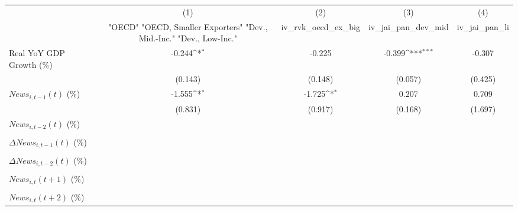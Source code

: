 {
\def\sym#1{\ifmmode^{#1}\else\(^{#1}\)\fi}
\begin{tabular}{l*{4}{c}}
\toprule
                    &\multicolumn{1}{c}{(1)}&\multicolumn{1}{c}{(2)}&\multicolumn{1}{c}{(3)}&\multicolumn{1}{c}{(4)}\\
                    &\multicolumn{1}{c}{ "OECD" "OECD, Smaller Exporters" "Dev., Mid.-Inc." "Dev., Low-Inc."}&\multicolumn{1}{c}{iv_rvk_oecd_ex_big}&\multicolumn{1}{c}{iv_jai_pan_dev_mid}&\multicolumn{1}{c}{iv_jai_pan_li}\\
\midrule
Real YoY GDP Growth (\%)&      -0.244\sym{*}  &      -0.225         &      -0.399\sym{***}&      -0.307         \\
                    &     (0.143)         &     (0.148)         &     (0.057)         &     (0.425)         \\
\addlinespace
$ News_{i,t-1}(t)$ (\%)&      -1.555\sym{*}  &      -1.725\sym{*}  &       0.207         &       0.709         \\
                    &     (0.831)         &     (0.917)         &     (0.168)         &     (1.697)         \\
\addlinespace
$ News_{i,t-2}(t)$ (\%)&                     &                     &                     &                     \\
                    &                     &                     &                     &                     \\
\addlinespace
$ \Delta News_{i,t-1}(t)$ (\%)&                     &                     &                     &                     \\
                    &                     &                     &                     &                     \\
\addlinespace
$ \Delta News_{i,t-2}(t)$ (\%)&                     &                     &                     &                     \\
                    &                     &                     &                     &                     \\
\addlinespace
$ News_{i,t}(t+1)$ (\%)&                     &                     &                     &                     \\
                    &                     &                     &                     &                     \\
\addlinespace
$ News_{i,t}(t+2)$ (\%)&                     &                     &                     &                     \\

\end{tabular}}
